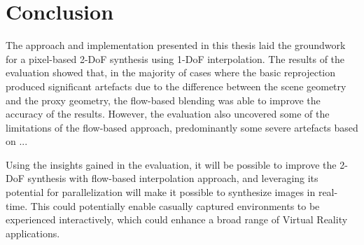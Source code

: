 \chapter{Conclusion}

The approach and implementation presented in this thesis laid the groundwork for a pixel-based 2-DoF synthesis using 1-DoF interpolation. 
The results of the evaluation showed that, in the majority of cases where the basic reprojection produced significant artefacts due to the difference between the scene geometry and the proxy geometry, the flow-based blending was able to improve the accuracy of the results.
However, the evaluation also uncovered some of the limitations of the flow-based approach, predominantly some severe artefacts based on ...

Using the insights gained in the evaluation, it will be possible to improve the 2-DoF synthesis with flow-based interpolation approach, and leveraging its potential for parallelization will make it possible to synthesize images in real-time.
This could potentially enable casually captured environments to be experienced interactively, which could enhance a broad range of Virtual Reality applications.





